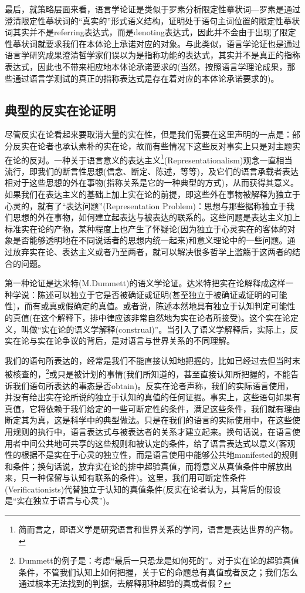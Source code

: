 \documentclass{article}
\begin{document}
{最后，就策略层面来看，语言学论证是类似于罗素分析限定性摹状词—罗素是通过澄清限定性摹状词的“真实的”形式语义结构，证明处于语句主词位置的限定性摹状词其实并不是referring表达式，而是denoting表达式，因此并不会由于出现了限定性摹状词就要求我们在本体论上承诺对应的对象。与此类似，语言学论证也是通过语言学研究成果澄清哲学家们误以为是指称功能的表达式，其实并不是真正的指称表达式，因此也不带来相应地本体论承诺要求的(当然，按照语言学理论成果，那些通过语言学测试的真正的指称表达式是存在着对应的本体论承诺要求的)。
}
\subsection{典型的反实在论证明}
尽管反实在论看起来要取消大量的实在性，但是我们需要在这里声明的一点是：部分反实在论者也承认素朴的实在论，故而有些情况下这些反对事实上只是对主题实在论的反对。一种关于语言意义的表达主义\footnote{简而言之，即语义学是研究语言和世界关系的学问，语言是表达世界的产物。}(Representationalism)观念一直相当流行，即我们的断言性思想(信念、断定、陈述，等等)，及它们的语言承载者表达相对于这些思想的外在事物(指称关系是它的一种典型的方式)，从而获得其意义。如果我们在表达主义的基础上加上实在论的前提，即这些外在事物被解释为独立于心灵的，就有了“表达问题”(Representation Problem)：思想与那些据称独立于我们思想的外在事物，如何建立起表达与被表达的联系的。这些问题是表达主义加上标准实在论的产物，某种程度上也产生了怀疑论(因为独立于心灵实在的客体的对象是否能够透明地在不同说话者的思想内统一起来)和意义理论中的一些问题。通过放弃实在论、表达主义或者乃至两者，就可以解决很多哲学上滥觞于这两者的结合的问题。


第一种论证是达米特(M.Dummett)的语义学论证。达米特把实在论解释成这样一种学说：陈述可以独立于它是否被确证或证明(甚至独立于被确证或证明的可能性)，而有或真或假确定的真值。或者说，陈述本然地具有独立于认知判定可能性的真值(在这个解释下，排中律应该非常自然地为实在论者所接受)。这个实在论定义，叫做“实在论的语义学解释(construal)”。当引入了语义学解释后，实际上，反实在论与实在论争议的背后，是对语言与世界关系的不同理解。

我们的语句所表达的，经常是我们不能直接认知地把握的，比如已经过去但当时末被核查的，\footnote{Dummett的例子是：考虑“最后一只恐龙是如何死的”。对于实在论的超验真值条件，不管我们认知上如何把握，关于它的命题总有真值或者反之；我们怎么通过根本无法找到的判据，去解释那种超验的真或者假？}或只是被计划的事情(我们所知道的，甚至直接认知所把握的，不能告诉我们语句所表达的事态是否obtain)。反实在论者声称，我们的实际语言使用，并没有给出实在论所说的独立于认知的真值的任何证据。事实上，这些语句如果有真值，它将依赖于我们给定的一些可断定性的条件，满足这些条件，我们就有理由断定其为真，这是科学中的典型做法。只是在我们的语言的实际使用中，在这些使用规则的执行中，语言表达式与被表达者的关系才建立起来。换句话说，在语言使用者中间公共地可共享的这些规则和被认定的条件，给了语言表达式以意义(客观性的根据不是实在于心灵的独立性，而是语言使用中能够公共地manifested的规则和条件；换句话说，放弃实在论的排中超验真值，而将意义从真值条件中解放出来，只一种保留与认知有联系的条件)。这里，我们用可断定性条件(Verificationists)代替独立于认知的真值条件(反实在论者认为，其背后的假设是“实在独立于语言与心灵”)。
\end{document}
